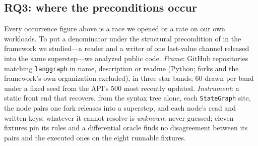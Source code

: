 \subsection{RQ3: where the preconditions occur}
\label{sec:prevalence}
Every occurrence figure above is a race we opened or a rate on our own
workloads. To put a denominator under the structural precondition of  in
the framework we studied---a reader and a writer of one last-value channel
released into the same superstep---we analyzed public code. \emph{Frame}:
GitHub repositories matching \texttt{langgraph} in name, description or
readme (Python; forks and the framework's own organization excluded), in
three star bands; $60$ drawn per band under a fixed seed from the API's $500$
most recently updated. \emph{Instrument}: a static front end that recovers,
from the syntax tree alone, each \texttt{StateGraph} site, the node pairs one
fork releases into a superstep, and each node's read and written keys;
whatever it cannot resolve is \emph{unknown}, never guessed; eleven fixtures
pin its rules and a differential oracle finds no disagreement between its
pairs and the executed ones on the eight runnable fixtures.

\begin{table}[t]
\centering
\caption{Census of public LangGraph repositories (frame of 19 September 2026,
seed fixed). Repositories unless marked; Wilson 95\% intervals.
\emph{Confirmed}: a co-scheduled reader and writer of a last-value channel.
\emph{Upper}: also pairs with an unresolved side.}
\label{tab:census}
\footnotesize
\setlength{\tabcolsep}{3pt}
\end{table}

